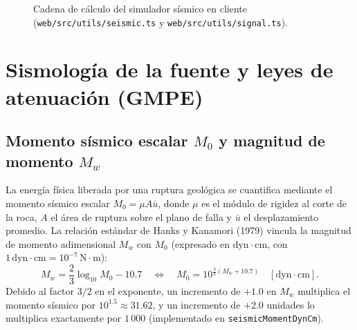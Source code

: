 \documentclass[11pt,a4paper]{article}
\newcommand{\src}[1]{\nolinkurl{#1}}
\newcommand{\unit}[1]{\mathrm{#1}}
\begin{document}
\begin{figure}[htbp]
\centering
{}
\caption{Cadena de cálculo del simulador sísmico en cliente (\src{web/src/utils/seismic.ts} y
\src{web/src/utils/signal.ts}).}
\label{fig:flujo-sismo}
\end{figure}

\section{Sismología de la fuente y leyes de atenuación (GMPE)}
\label{sec:sismo-gmpe}

\subsection{Momento sísmico escalar \texorpdfstring{$M_0$}{M0} y magnitud de momento \texorpdfstring{$M_w$}{Mw}}
\label{sec:sismo-momento}

La energía física liberada por una ruptura geológica se cuantifica mediante el momento sísmico escalar
$M_0 = \mu A \bar u$, donde $\mu$ es el módulo de rigidez al corte de la roca, $A$ el área de ruptura sobre el
plano de falla y $\bar u$ el desplazamiento promedio. La relación estándar de Hanks y Kanamori (1979) vincula la
magnitud de momento adimensional $M_w$ con $M_0$ (expresado en $\unit{dyn\cdot cm}$, con
$1\,\unit{dyn\cdot cm} = 10^{-7}\,\unit{N\cdot m}$):
\begin{equation}
  M_w = \frac{2}{3}\log_{10} M_0 - 10.7
  \quad\Longleftrightarrow\quad
  M_0 = 10^{\frac{3}{2}(M_w + 10.7)}\quad[\unit{dyn\cdot cm}].
  \label{eq:momento-sismico}
\end{equation}
Debido al factor $3/2$ en el exponente, un incremento de $+1.0$ en $M_w$ multiplica el momento sísmico por
$10^{1.5}\approx 31.62$, y un incremento de $+2.0$ unidades lo multiplica exactamente por $1\,000$
(implementado en \texttt{seismicMomentDynCm}).
\end{document}
